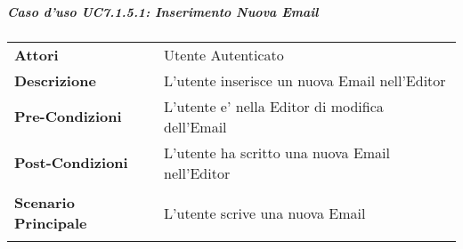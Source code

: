 \subparagraph{Caso d'uso UC7.1.5.1:  Inserimento Nuova Email}
\label{UC7_1_5_1}

\begin{tabular}{ l | p{11cm}}
	\hline
	\rowcolor{Gray}
	 \multicolumn{2}{c}{UC7.1.5.1 - Inserimento Nuova Email} \\
	 \hline
	\textbf{Attori} & Utente Autenticato \\
	\textbf{Descrizione} & L'utente inserisce un nuova Email nell'Editor\\
	\textbf{Pre-Condizioni} & L'utente e' nella Editor di modifica dell'Email\\
	\textbf{Post-Condizioni} & L'utente ha scritto una nuova Email nell'Editor\\
	\textbf{Scenario Principale} & 
	\begin{enumerate*}[label=(\arabic*.),itemjoin={\newline}]
		\item L'utente scrive una nuova Email
	\end{enumerate*}\\
\end{tabular}